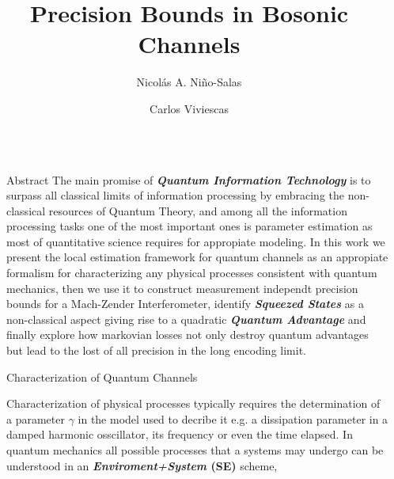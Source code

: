 \documentclass[final]{beamer}
\title{Precision Bounds in Bosonic Channels}
\author{Nicolás A. Niño-Salas \inst{1} \and Carlos Viviescas  \inst{2} }
\institute[shortinst]{Universidad Nacional de Colombia, Sede Bogotá }
\newlength{\sepwidth}
\newlength{\colwidth}
\newcommand{\separatorcolumn}{\begin{column}{\sepwidth}\end{column}}
\begin{document}
\begin{frame}[t]
\begin{columns}[t]
\separatorcolumn

\begin{column}{\colwidth}

  \begin{block}{Abstract}
    The main promise of \textit{\textbf{Quantum Information Technology}} is to surpass all classical limits of information
    processing by embracing the non-classical resources of Quantum
    Theory, and among all the information processing tasks one of the
    most important ones is parameter estimation as most of
    quantitative science requires for appropiate modeling. In this
    work we present the local estimation framework for quantum
    channels  as an appropiate formalism
    for characterizing any physical processes consistent with
    quantum mechanics, then we use it to construct measurement
    independt precision bounds for a Mach-Zender Interferometer,
    identify \textit{\textbf{Squeezed States}} as a non-classical
    aspect giving rise to a quadratic \textit{\textbf{Quantum Advantage}} and finally explore how markovian losses not only
    destroy quantum advantages but lead to the lost of all precision
    in the long encoding limit.
  \end{block}

  \begin{block}{Characterization of Quantum Channels}
  \end{block}
  Characterization of physical processes typically requires the determination of a parameter $\gamma$ in the model used to decribe it e.g.
  a dissipation parameter in a damped harmonic osscillator, its frequency or even the time elapsed. In quantum mechanics
  all possible processes that a systems may undergo can be understood in an \textbf{\textit{Enviroment+System} (SE)} scheme,
\vspace{-0.025\linewidth}


\end{column}
\end{columns}
\end{frame}
\end{document}
